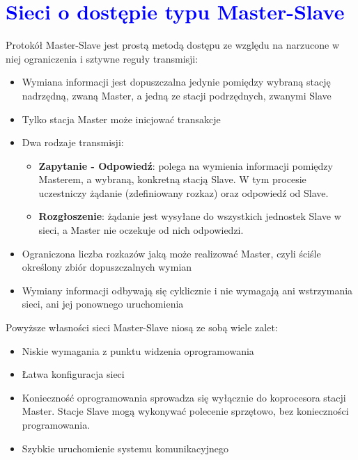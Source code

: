 \documentclass[a4paper,twoside]{article}
\begin{document}
\section{\textcolor{blue}{Sieci o dostępie typu Master-Slave}}
Protokół Master-Slave jest prostą metodą dostępu ze względu na narzucone w niej ograniczenia i sztywne reguły transmisji:
\begin{itemize}
	\item Wymiana informacji jest dopuszczalna jedynie pomiędzy wybraną stację nadrzędną, zwaną Master, a jedną ze stacji podrzędnych, zwanymi Slave
	\item Tylko stacja Master może inicjować transakcje
	\item Dwa rodzaje transmisji:
	\begin{itemize}
		\item \textbf{Zapytanie - Odpowiedź}: polega na wymienia informacji pomiędzy Masterem, a wybraną, konkretną stacją Slave. W tym procesie uczestniczy żądanie (zdefiniowany rozkaz) oraz odpowiedź od Slave.
		\item \textbf{Rozgłoszenie}: żądanie jest wysyłane do wszystkich jednostek Slave w sieci, a Master nie oczekuje od nich odpowiedzi.
	\end{itemize}
	\item Ograniczona liczba rozkazów jaką może realizować Master, czyli ściśle określony zbiór dopuszczalnych wymian
	\item Wymiany informacji odbywają się cyklicznie i nie wymagają ani wstrzymania sieci, ani jej ponownego uruchomienia
\end{itemize}
Powyższe własności sieci Master-Slave niosą ze sobą wiele zalet:
\begin{itemize}
	\item Niskie wymagania z punktu widzenia oprogramowania
	\item Łatwa konfiguracja sieci
	\item Konieczność oprogramowania sprowadza się wyłącznie do koprocesora stacji Master. Stacje Slave mogą wykonywać polecenie sprzętowo, bez konieczności programowania.
	\item Szybkie uruchomienie systemu komunikacyjnego
\end{itemize}
\end{document}
